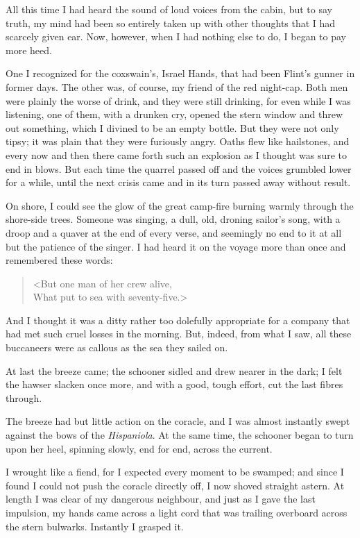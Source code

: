 All this time I had heard the sound of loud voices from the cabin, but to say truth, my mind had been so entirely taken up with other thoughts that I had scarcely given ear. Now, however, when I had nothing else to do, I began to pay more heed.

One I recognized for the coxswain's, Israel Hands, that had been Flint's gunner in former days. The other was, of course, my friend of the red night-cap. Both men were plainly the worse of drink, and they were still drinking, for even while I was listening, one of them, with a drunken cry, opened the stern window and threw out something, which I divined to be an empty bottle. But they were not only tipsy; it was plain that they were furiously angry. Oaths flew like hailstones, and every now and then there came forth such an explosion as I thought was sure to end in blows. But each time the quarrel passed off and the voices grumbled lower for a while, until the next crisis came and in its turn passed away without result.

On shore, I could see the glow of the great camp-fire burning warmly through the shore-side trees. Someone was singing, a dull, old, droning sailor's song, with a droop and a quaver at the end of every verse, and seemingly no end to it at all but the patience of the singer. I had heard it on the voyage more than once and remembered these words:

\begin{verse}
<But one man of her crew alive,\\
What put to sea with seventy-five.>
\end{verse}

And I thought it was a ditty rather too dolefully appropriate for a company that had met such cruel losses in the morning. But, indeed, from what I saw, all these buccaneers were as callous as the sea they sailed on.

At last the breeze came; the schooner sidled and drew nearer in the dark; I felt the hawser slacken once more, and with a good, tough effort, cut the last fibres through.

The breeze had but little action on the coracle, and I was almost instantly swept against the bows of the \textit{Hispaniola}. At the same time, the schooner began to turn upon her heel, spinning slowly, end for end, across the current.

I wrought like a fiend, for I expected every moment to be swamped; and since I found I could not push the coracle directly off, I now shoved straight astern. At length I was clear of my dangerous neighbour, and just as I gave the last impulsion, my hands came across a light cord that was trailing overboard across the stern bulwarks. Instantly I grasped it.

